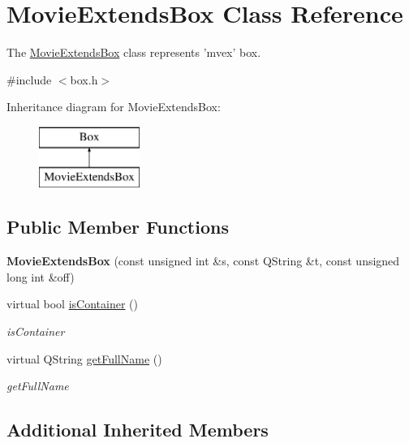 \hypertarget{class_movie_extends_box}{\section{Movie\-Extends\-Box Class Reference}
\label{class_movie_extends_box}
}


The \hyperlink{class_movie_extends_box}{Movie\-Extends\-Box} class represents 'mvex' box.  




{\ttfamily \#include $<$box.\-h$>$}

Inheritance diagram for Movie\-Extends\-Box\-:\begin{figure}[H]
\begin{center}
\leavevmode
\includegraphics[height=2.000000cm]{class_movie_extends_box}
\end{center}
\end{figure}
\subsection*{Public Member Functions}
\begin{DoxyCompactItemize}
\item 
\hypertarget{class_movie_extends_box_a7da17e025996da2beafee208b116f1fd}{{\bfseries Movie\-Extends\-Box} (const unsigned int \&s, const Q\-String \&t, const unsigned long int \&off)}\label{class_movie_extends_box_a7da17e025996da2beafee208b116f1fd}

\item 
virtual bool \hyperlink{class_movie_extends_box_a8b970223c7bc6518dc09a86a2398dc97}{is\-Container} ()
\begin{DoxyCompactList}\small\item\em is\-Container \end{DoxyCompactList}\item 
virtual Q\-String \hyperlink{class_movie_extends_box_ae61f578cd6f7e0e8f3eb1de0c1ae2c50}{get\-Full\-Name} ()
\begin{DoxyCompactList}\small\item\em get\-Full\-Name \end{DoxyCompactList}\end{DoxyCompactItemize}
\subsection*{Additional Inherited Members}


